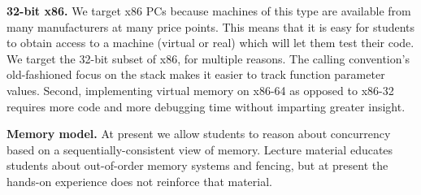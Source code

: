 \textbf{32-bit x86.}
We target x86 PCs because machines of this type are
available from many manufacturers at many price points.
This means that it is easy for students to obtain access
to a machine (virtual or real) which will let them
test their code.
%
We target the 32-bit
subset of x86, for multiple reasons.
The calling convention's old-fashioned focus on the stack
makes it easier to track function parameter values.
Second, implementing virtual memory on x86-64 as
opposed to x86-32 requires more code and more
debugging time without imparting greater
insight.

\textbf{Memory model.}
At present we allow students
to reason about concurrency based on a
sequentially-consistent view of
memory.
Lecture material educates students about
out-of-order memory systems
and fencing,
but at present the hands-on experience does not
reinforce that material.

